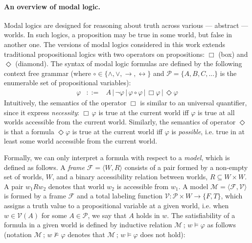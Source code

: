 \documentclass[sigconf,anonymous]{acmart}
\begin{document}
\paragraph{An overview of modal logic.} Modal logics are designed for reasoning
about truth across various --- abstract --- worlds. In such logics, a
proposition may be true in some world, but false in another one. The versions of
modal logics considered in this work extends traditional propositional logics
with two operators on propositions: $\Box$ (box) and $\Diamond$ (diamond).
The syntax of modal logic formulas are defined by the following context free
grammar (where $\circ \in\{\land,\lor,\to,\leftrightarrow\}$ and
$\mathcal{P} = \{A,B,C,...\}$ is the enumerable set of propositional variables):
\[
  \begin{array}{lcl}
    \varphi & ::= & A\,|\,\neg\varphi\,|\,\varphi\circ\varphi\,|\,\Box\varphi\,|\,\Diamond\varphi
  \end{array}  
\]
Intuitively, the semantics of the operator $\Box$ is similar to an universal
quantifier, since it express \emph{necessity}: $\Box\,\varphi$ is true at the
current world iff $\varphi$ is true at all worlds accessible from the current
world. Similarly, the semantics of operator
$\Diamond$ is that a formula $\Diamond\varphi$ is true at the current
world iff $\varphi$ is \emph{possible}, i.e. true in at least some world
accessible from the current world.

Formally, we can only interpret a formula with respect to a \emph{model}, which is
defined as follows.
A \emph{frame} $\mathcal{F} = \langle W, R \rangle$ consists of a pair formed by
a non-empty set of worlds, $W$, and a binary accessibility relation between
worlds, $R \subseteq W \times W$. A pair $w_1Rw_2$ denotes that world $w_2$ is
accessible from $w_1$. A model $\mathcal{M} = \langle \mathcal{F}, \mathcal{V} \rangle$
is formed by a frame $\mathcal{F}$ and a total labeling function
$\mathcal{V} : \mathcal{P}\times W\to \{F,T\}$, which assigns
a truth value to a propositional variable at a given world, i.e. when $w \in \mathcal{V}(A)$
for some $A \in\mathcal{P}$, we say that $A$ holds in $w$. The satisfiability of a formula
in a given world is defined by inductive relation $\mathcal{M}\,;\,w\models \varphi$ as
follows (notation $\mathcal{M}\,;\,w\not\models \varphi$ denotes
that $\mathcal{M}\,;\,w\models \varphi$ does not hold):
\end{document}
